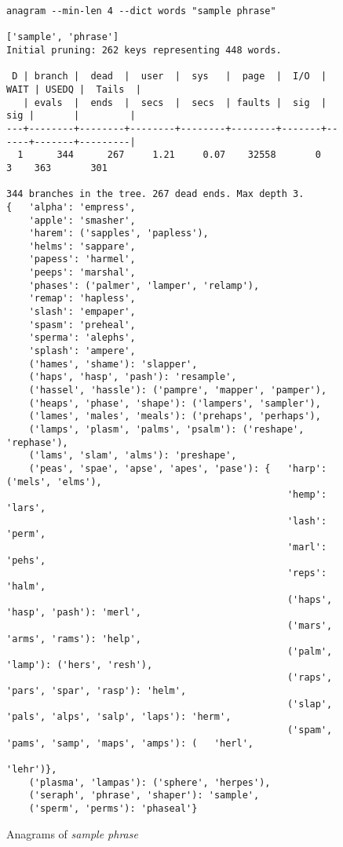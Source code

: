\documentclass[letterpaper, 11pt]{article}
\begin{document}
\begin{figure}
\footnotesize
\begin{verbatim}
anagram --min-len 4 --dict words "sample phrase"

['sample', 'phrase']
Initial pruning: 262 keys representing 448 words.

 D | branch |  dead  |  user  |  sys   |  page  |  I/O  | WAIT | USEDQ |  Tails  |
   | evals  |  ends  |  secs  |  secs  | faults |  sig  |  sig |       |         |
---+--------+--------+--------+--------+--------+-------+------+-------+---------|
  1      344      267     1.21     0.07    32558       0      3    363       301

344 branches in the tree. 267 dead ends. Max depth 3.
{   'alpha': 'empress',
    'apple': 'smasher',
    'harem': ('sapples', 'papless'),
    'helms': 'sappare',
    'papess': 'harmel',
    'peeps': 'marshal',
    'phases': ('palmer', 'lamper', 'relamp'),
    'remap': 'hapless',
    'slash': 'empaper',
    'spasm': 'preheal',
    'sperma': 'alephs',
    'splash': 'ampere',
    ('hames', 'shame'): 'slapper',
    ('haps', 'hasp', 'pash'): 'resample',
    ('hassel', 'hassle'): ('pampre', 'mapper', 'pamper'),
    ('heaps', 'phase', 'shape'): ('lampers', 'sampler'),
    ('lames', 'males', 'meals'): ('prehaps', 'perhaps'),
    ('lamps', 'plasm', 'palms', 'psalm'): ('reshape', 'rephase'),
    ('lams', 'slam', 'alms'): 'preshape',
    ('peas', 'spae', 'apse', 'apes', 'pase'): {   'harp': ('mels', 'elms'),
                                                  'hemp': 'lars',
                                                  'lash': 'perm',
                                                  'marl': 'pehs',
                                                  'reps': 'halm',
                                                  ('haps', 'hasp', 'pash'): 'merl',
                                                  ('mars', 'arms', 'rams'): 'help',
                                                  ('palm', 'lamp'): ('hers', 'resh'),
                                                  ('raps', 'pars', 'spar', 'rasp'): 'helm',
                                                  ('slap', 'pals', 'alps', 'salp', 'laps'): 'herm',
                                                  ('spam', 'pams', 'samp', 'maps', 'amps'): (   'herl',
                                                                                                'lehr')},
    ('plasma', 'lampas'): ('sphere', 'herpes'),
    ('seraph', 'phrase', 'shaper'): 'sample',
    ('sperm', 'perms'): 'phaseal'}
\end{verbatim}
\normalsize
\caption{Anagrams of \emph{sample phrase}}
\label{fig:samplephrase}
\end{figure}
\end{document}
